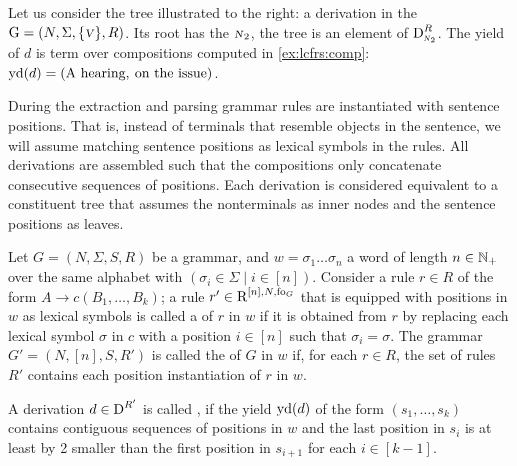 \documentclass[../../document.tex]{subfiles}
\begin{document}
    \begin{wrapfigure}[6]{r}{0pt}
    \end{wrapfigure}
    \label{ex:lcfrs:deriv}
    Let us consider the tree illustrated to the right: a derivation in the  \(\mathrm{G} = (N, \Sigma, \{\textsc{\textsl{v}}\}, R)\).
    Its root has the  \(\textsc{\textsl{n}}_2\), the tree is an element of \(\operatorname{D}^R_{\textsc{\textsl{n}}_2}\).
    The yield of \(d\) is term over compositions computed in \cref{ex:lcfrs:comp}: \(\operatorname{yd}(d) = (\text{A hearing}, \: \text{on the issue})\).
    \exampleqed

    \vspace{\baselineskip}

    During the extraction and parsing grammar rules are instantiated with sentence positions. \citep[Definition 6.8]{Kal10}
    That is, instead of terminals that resemble objects in the sentence, we will assume matching sentence positions as lexical symbols in the rules.
    All derivations are assembled such that the compositions only concatenate consecutive sequences of positions.
    Each derivation is considered equivalent to a constituent tree that assumes the  nonterminals as inner nodes and the sentence positions as leaves.

    \begin{definition}
        Let \(G = (N, \varSigma, S, R)\) be a grammar, and \(w = \sigma_1 \ldots \sigma_n\) a word of length \(n \in \mathbb{N}_+\) over the same alphabet with \((\sigma_i \in \varSigma \mid i \in [n])\).
        Consider a rule \(r\in R\) of the form \(A \to c (B_1, \ldots, B_k)\); a rule \(r' \in \operatorname{R}^{[n],N,\operatorname{fo}_G}\) that is equipped with positions in \(w\) as lexical symbols is called a  of \(r\) in \(w\) if it is obtained from \(r\) by replacing each lexical symbol \(\sigma\) in \(c\) with a position \(i \in [n]\) such that \(\sigma_i = \sigma\).
        The grammar \(G' = (N, [n], S, R')\) is called the  of \(G\) in \(w\) if, for each \(r \in R\), the set of rules \(R'\) contains each position instantiation of \(r\) in \(w\).
        
        A derivation \(d \in \operatorname{D}^{R'}\) is called , if the yield \(\operatorname{yd}(d)\) of the form \((s_1, \ldots, s_k)\) contains contiguous sequences of positions in \(w\) and the last position in \(s_i\) is at least by 2 smaller than the first position in \(s_{i+1}\) for each \(i \in [k-1]\).
    \end{definition}
\end{document}
